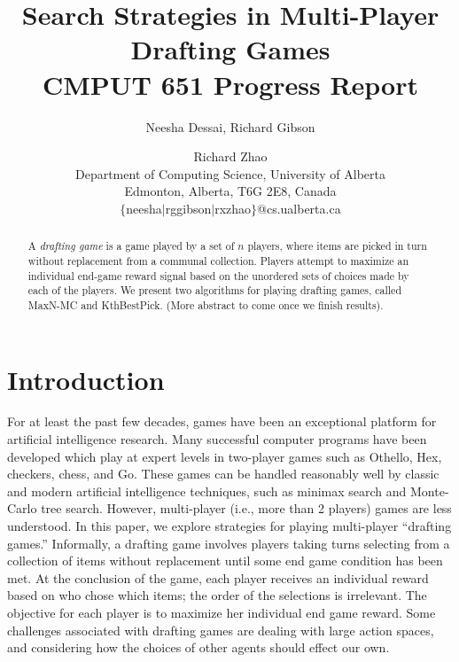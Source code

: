\documentclass[letterpaper]{article}
\title{Search Strategies in Multi-Player Drafting Games  \\ \small \vspace{0.1cm} CMPUT 651 Progress Report}
\author{Neesha Dessai, Richard Gibson \and Richard Zhao \\
Department of Computing Science, University of Alberta \\
Edmonton, Alberta, T6G 2E8, Canada \\
$\{$neesha$\mid$rggibson$\mid$rxzhao$\}$@cs.ualberta.ca}
\numberwithin{equation}{section}
\numberwithin{theorem}{section}
\numberwithin{lemma}{section}
\numberwithin{df}{section}
\begin{document}
\maketitle

\begin{abstract}
A \emph{drafting game} is a game played by a set of $n$ players, where items are picked in turn without replacement from a communal collection.  Players attempt to maximize an individual end-game reward signal based on the unordered sets of choices made by each of the players.  We present two algorithms for playing drafting games, called MaxN-MC and KthBestPick.  (More abstract to come once we finish results).
\end{abstract}

\section{Introduction}


For at least the past few decades, games have been an exceptional platform for artificial intelligence research.  Many successful computer programs have been developed which play at expert levels in two-player games such as Othello, Hex, checkers, chess, and Go.  These games can be handled reasonably well by classic and modern artificial intelligence techniques, such as minimax search and Monte-Carlo tree search.  However, multi-player (i.e., more than 2 players) games are less understood.  In this paper, we explore strategies for playing multi-player ``drafting games.''  Informally, a drafting game involves players taking turns selecting from a collection of items without replacement until some end game condition has been met.  At the conclusion of the game, each player receives an individual reward based on who chose which items; the order of the selections is irrelevant.  The objective for each player is to maximize her individual end game reward.  Some challenges associated with drafting games are dealing with large action spaces, and considering how the choices of other agents should effect our own.
\end{document}
